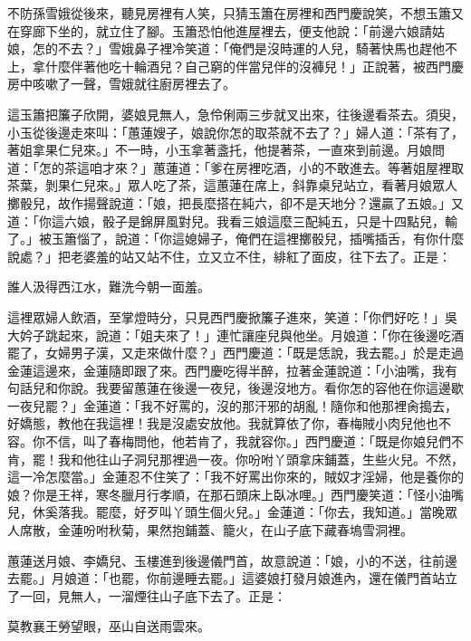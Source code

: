 不防孫雪娥從後來，聽見房裡有人笑，只猜玉簫在房裡和西門慶說笑，不想玉簫又在穿廊下坐的，就立住了腳。玉簫恐怕他進屋裡去，便支他說：「前邊六娘請姑娘，怎的不去？」雪娥鼻子裡冷笑道：「俺們是沒時運的人兒，騎著快馬也趕他不上，拿什麼伴著他吃十輪酒兒？自己窮的伴當兒伴的沒褲兒！」正說著，被西門慶房中咳嗽了一聲，雪娥就往廚房裡去了。

這玉簫把簾子欣開，婆娘見無人，急伶俐兩三步就叉出來，往後邊看茶去。須臾，小玉從後邊走來叫：「蕙蓮嫂子，娘說你怎的取茶就不去了？」婦人道：「茶有了，著姐拿果仁兒來。」不一時，小玉拿著盞托，他提著茶，一直來到前邊。月娘問道：「怎的茶這咱才來？」蕙蓮道：「爹在房裡吃酒，小的不敢進去。等著姐屋裡取茶葉，剝果仁兒來。」眾人吃了茶，這蕙蓮在席上，斜靠桌兒站立，看著月娘眾人擲骰兒，故作揚聲說道：「娘，把長麼搭在純六，卻不是天地分？還贏了五娘。」又道：「你這六娘，骰子是錦屏風對兒。我看三娘這麼三配純五，只是十四點兒，輸了。」被玉簫惱了，說道：「你這媳婦子，俺們在這裡擲骰兒，插嘴插舌，有你什麼說處？」把老婆羞的站又站不住，立又立不住，緋紅了面皮，往下去了。正是：

誰人汲得西江水，難洗今朝一面羞。

這裡眾婦人飲酒，至掌燈時分，只見西門慶掀簾子進來，笑道：「你們好吃！」吳大妗子跳起來，說道：「姐夫來了！」連忙讓座兒與他坐。月娘道：「你在後邊吃酒罷了，女婦男子漢，又走來做什麼？」西門慶道：「既是恁說，我去罷。」於是走過金蓮這邊來，金蓮隨即跟了來。西門慶吃得半醉，拉著金蓮說道：「小油嘴，我有句話兒和你說。我要留蕙蓮在後邊一夜兒，後邊沒地方。看你怎的容他在你這邊歇一夜兒罷？」金蓮道：「我不好罵的，沒的那汗邪的胡亂！隨你和他那裡肏搗去，好嬌態，教他在我這裡！我是沒處安放他。我就算依了你，春梅賊小肉兒他也不容。你不信，叫了春梅問他，他若肯了，我就容你。」西門慶道：「既是你娘兒們不肯，罷！我和他往山子洞兒那裡過一夜。你吩咐丫頭拿床鋪蓋，生些火兒。不然，這一冷怎麼當。」金蓮忍不住笑了：「我不好罵出你來的，賊奴才淫婦，他是養你的娘？你是王祥，寒冬臘月行孝順，在那石頭床上臥冰哩。」西門慶笑道：「怪小油嘴兒，休奚落我。罷麼，好歹叫丫頭生個火兒。」金蓮道：「你去，我知道。」當晚眾人席散，金蓮吩咐秋菊，果然抱鋪蓋、籠火，在山子底下藏春塢雪洞裡。

蕙蓮送月娘、李嬌兒、玉樓進到後邊儀門首，故意說道：「娘，小的不送，往前邊去罷。」月娘道：「也罷，你前邊睡去罷。」這婆娘打發月娘進內，還在儀門首站立了一回，見無人，一溜煙往山子底下去了。正是：

莫教襄王勞望眼，巫山自送雨雲來。

